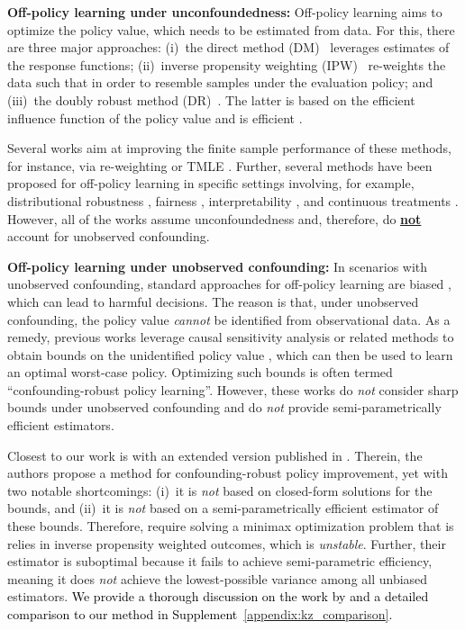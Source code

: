 \documentclass{article} %
\theoremstyle{plain}
\theoremstyle{definition}
\theoremstyle{remark}
\newcommand{\rebuttal}[1]{\textcolor{black}{#1}}
\begin{document}
\textbf{Off-policy learning under unconfoundedness:} Off-policy learning aims to optimize the policy value, which needs to be estimated from data. For this, there are three major approaches: (i)~the direct method (DM)~\citep{Qian.2011} leverages estimates of the response functions; (ii)~inverse propensity weighting (IPW)~\citep{Swaminathan.2015} re-weights the data such that in order to resemble samples under the evaluation policy; and (iii)~the doubly robust method (DR)~\citep{Athey.2021,Dudik.2011}. The latter is based on the efficient influence function of the policy value \citep{Robins.1994b} and is %
efficient \citep{Chernozhukov.2018,vanderVaart.1998}. 

Several works aim at improving the finite sample performance of these methods, for instance, via re-weighting \citep{Kallus.2018, Kallus.2021b} or TMLE 
\citep{Bibaut.2019}. Further, several methods have been proposed for off-policy learning in specific settings involving, for example, distributional robustness \citep{Kallus.2022}, fairness \citep{Frauen.2024}, interpretability \citep{Tschernutter.2022}, and continuous treatments \citep{Kallus.2018d, Schweisthal.2023}. However, all of the works assume unconfoundedness and, therefore, do \textbf{\underline{not}} account for unobserved confounding.


\textbf{Off-policy learning under unobserved confounding:} In scenarios with unobserved confounding, standard approaches for off-policy learning are biased \citep{Kallus.2018c,Kallus.2021d}, which can lead to harmful decisions. The reason is that, under unobserved confounding, the policy value  \emph{cannot} be identified from observational data. As a remedy, previous works leverage causal sensitivity analysis or related methods to obtain bounds on the unidentified policy value \citep{Bellot.2024,Guerdan.2024, Huang.2024,  Joshi.2024,Namkoong.2020, Zhang.2024}, which can then be used to learn an optimal worst-case policy. Optimizing such bounds is often termed ``confounding-robust policy learning''.
However, these works do \emph{not} consider sharp bounds under unobserved confounding and do \emph{not} provide semi-parametrically efficient estimators.

Closest to our work is \citep{Kallus.2018c} with an extended version published in \citep{Kallus.2021d}. Therein, the authors propose a method for confounding-robust policy improvement, yet with two notable shortcomings: (i)~it is \emph{not} based on closed-form solutions for the bounds, and (ii)~it is \emph{not} based on a semi-parametrically efficient estimator of these bounds. Therefore, \citet{Kallus.2018c,Kallus.2021d} require solving a minimax optimization problem that is relies in inverse propensity weighted outcomes, which is \emph{unstable}. Further, their estimator is suboptimal because it fails to achieve semi-parametric efficiency, meaning it does \emph{not} achieve the lowest-possible variance among all unbiased estimators. \rebuttal{We provide a thorough discussion on the work by \citet{Kallus.2018c,Kallus.2021d} and a detailed comparison to our method in Supplement~\ref{appendix:kz_comparison}.}
\end{document}
